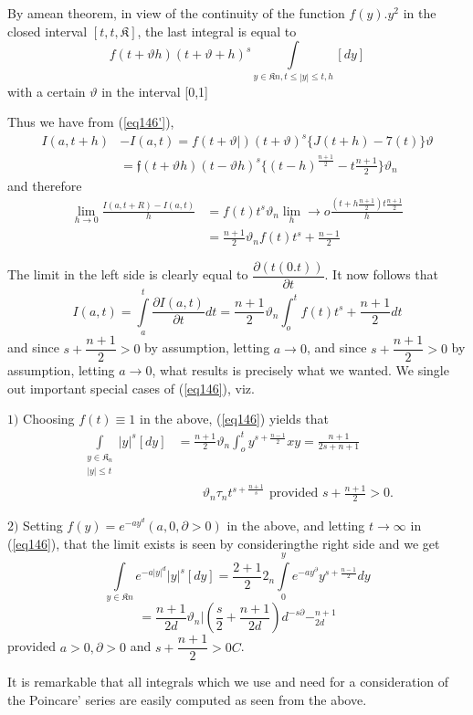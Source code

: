 By a\pageoriginale  mean theorem, in view of the continuity of the
function $f(y). 
y^2$ in the closed interval $[t, t, \mathfrak{K}]$, the last integral
is equal to  
$$
f ( t + \vartheta h ) (t + \vartheta + h )^s \int\limits_{ y \in 
  \mathfrak{K} n , t \leq |y| \leq t, h}[dy]  
$$
with a certain $\vartheta$ in the interval [0,1]

Thus we have from (\ref{eq146'}), 
\begin{align*}
I( a, t + h ) & - I(a, t)  = f (t + \vartheta |)( t + \vartheta)^s
\Big\{ J (t + h) - 7 (t)\Big\} \vartheta\\ 
& = \mathfrak{f} (t + \vartheta h) (t - \vartheta h)^s \{(t -
h)^{\frac{n + 1}{2}} - t \frac{n + 1}{2} \} \vartheta_n 
\end{align*}
and therefore 
\begin{align*}
\lim_{h \to 0} \frac{I (a, t + R) - I (a , t)}{h} & = f (t) t ^s
\vartheta _n \lim_h \to o \frac{(t + h \frac{n + 1}{2}) t \frac {n + 1
  }{2}}{h}\\ 
& = \frac{n + 1}{ 2} \vartheta _n f(t) t^s + \frac{n -1}{2} 
\end{align*}

The limit in the left side is clearly equal to $\dfrac{ \partial (t (
  0 . t))}{\partial t}$. It now follows that  
$$
I (a, t)= \int\limits_a^t \frac{\partial I (a, t)}{\partial t} d t = \frac{n
  + 1}{2} \vartheta _n \int^{t}_o f(t) t ^s + \frac{n + 1}{2} dt 
$$
and since $s + \dfrac{ n + 1}{2} > 0$ by assumption, letting $a \to
0$, and since $s + \dfrac{n + 1}{2} > 0$  by assumption, letting $a
\to 0$, what results is precisely what we wanted. We single out
important special cases of (\ref{eq146}), viz.  

$1)$ Choosing $ f (t) \equiv 1$ in the above, (\ref{eq146}) yields that 
\begin{align*}
\int\limits_{ \substack{y \in \mathfrak{K}_n \\ | y |\leq
    t}} |y|^s [d y] & = \frac{n +1}{2} \vartheta_n \int^t_o
y^{s + \frac{n-1}{2}} x y = \frac{ n + 1}{ 2s +n + 1}\\
& \qquad  \vartheta_n \tau
_n t ^{s + \frac{n +1}{s}}  \text{ provided } {s + \frac{n + 1}{2}} >
0. \tag{148}\label{eq148}  
\end{align*}

$2)$ Setting $f (y) = e^{ - a y^d } ( a , 0, \partial > 0)$ in the
above, and letting $ t \to \infty$ in (\ref{eq146}), that the limit exists is
seen by considering\pageoriginale  the right side and we get  
$$
\int\limits_{y \in \mathfrak{K}n} { e^{- a | y |^d}}|y|^s [dy] =
\frac{2 + 1}{2}2_n \int\limits_{0}^{y} e^{- ay^\partial} y ^{ s +
  \frac{n - 1}{2}} dy 
$$
\begin{equation*}
= \frac{ n + 1}{2 d} \vartheta_n |(\frac{s}{2} + \frac{n +1}{2d}) d^{
  -s \partial } - ^{ n + 1} _{ 2d} \tag{149}\label{eq149}   
\end{equation*}
provided $a > 0, \partial > 0$ and $s+\dfrac{ n +1}{2} > 0 C $. 

It is remarkable that all integrals which we use and need for a
consideration of the Poincare' series are easily computed as seen from
the above.  

